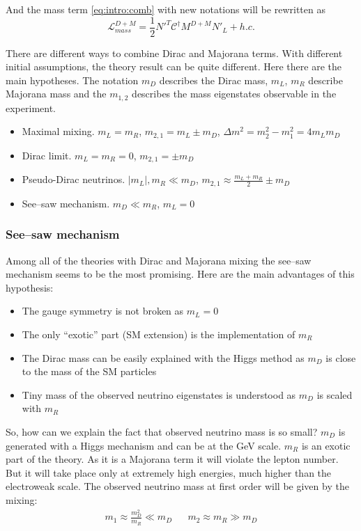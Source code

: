 \documentclass[../main.tex]{subfiles}
\begin{document}
And the mass term \autoref{eq:intro:comb} with new notations will be rewritten as
\begin{equation}
\mathcal{L}_{mass}^{D+M}=\frac{1}{2}N'^T\mathcal{C}^\dagger M^{D+M}N'_L+h.c.
\end{equation}

There are different ways to combine Dirac and Majorana terms. With different initial assumptions, the theory result can be quite different. Here there are the main hypotheses. The notation $m_D$ describes the Dirac mass, $m_L$, $m_R$ describe Majorana mass and the $m_{1,2}$ describes the mass eigenstates observable in the experiment.
\begin{itemize}
  \item Maximal mixing. $m_L=m_R$, $m_{2, 1}=m_L\pm m_D$, $\Delta m^2=m_2^2-m_1^2=4m_L m_D$
  \item Dirac limit. $m_L=m_R=0$, $m_{2,1}=\pm m_D$
  \item Pseudo-Dirac neutrinos. $\left|m_L\right|,m_R \ll m_D$, $m_{2,1}\approx\frac{m_L+m_R}{2}\pm m_D$
  \item See--saw mechanism. $m_D \ll m_R$, $m_L=0$
\end{itemize}

\subsubsection{See--saw mechanism}
Among all of the theories with Dirac and Majorana mixing the see--saw mechanism seems to be the most promising. Here are the main advantages of this hypothesis:
\begin{itemize}
  \item The gauge symmetry is not broken as $m_L=0$
  \item The only ``exotic'' part (SM extension) is the implementation of $m_R$
  \item The Dirac mass can be easily explained with the Higgs method as $m_D$ is close to the mass of the SM particles
  \item Tiny mass of the observed neutrino eigenstates is understood as $m_D$ is scaled with $m_R$
\end{itemize}

So, how can we explain the fact that observed neutrino mass is so small? $m_D$ is generated with a Higgs mechanism and can be at the GeV scale. $m_R$ is an exotic part of the theory. As it is a Majorana term it will violate the lepton number. But it will take place only at extremely high energies, much higher than the electroweak scale. The observed neutrino mass at first order will be given by the mixing:
\begin{align}
m_1\approx\frac{m_D^2}{m_R} \ll m_D && m_2\approx m_R \gg m_D
\end{align}
\end{document}

